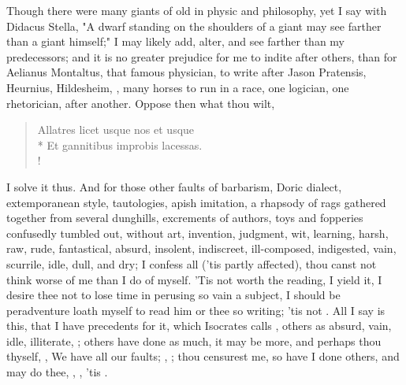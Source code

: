
Though there were many giants of old in physic and philosophy, yet I say with
Didacus Stella, "A dwarf standing on the shoulders of a
giant may see farther than a giant himself;" I may likely add, alter, and see
farther than my predecessors; and it is no greater prejudice for me to indite
after others, than for Aelianus Montaltus, that famous physician, to write
 after Jason Pratensis, Heurnius,
Hildesheim, \etc{}, many horses to run in a race, one logician, one
rhetorician, after another. Oppose then what thou wilt,

\begin{latin}
\begin{verse}%
Allatres licet usque nos et usque\\*
Et gannitibus improbis lacessas.\\!
\end{verse}%
\end{latin}


I solve it thus. And for those other faults of barbarism,
Doric dialect, extemporanean style, tautologies, apish
imitation, a rhapsody of rags gathered together from several dunghills,
excrements of authors, toys and fopperies confusedly tumbled out, without art,
invention, judgment, wit, learning, harsh, raw, rude, fantastical, absurd,
insolent, indiscreet, ill-composed, indigested, vain, scurrile, idle, dull, and
dry; I confess all ('tis partly affected), thou canst not think worse of me
than I do of myself. 'Tis not worth the reading, I yield it, I desire thee not
to lose time in perusing so vain a subject, I should be peradventure loath
myself to read him or thee so writing; 'tis not . All I say
is this, that I have precedents for it, which Isocrates
calls , others as absurd, vain, idle, illiterate,
\etc{} ; others have done as much, it may be
more, and perhaps thou thyself, , \etc{} We have all our
faults; , \etc{}; thou
censurest me, so have I done others, and may do thee, ,
\etc{}, 'tis .

